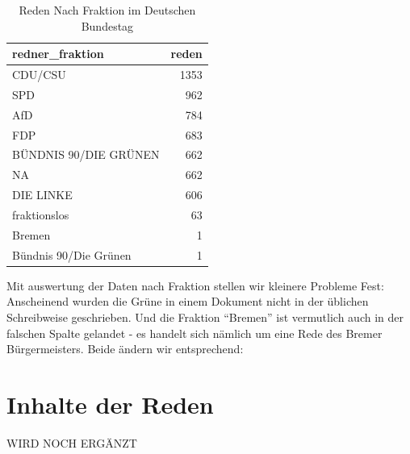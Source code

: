\documentclass[oneside, 12pt, numbers=endperiod]{scrbook}
\newenvironment{Shaded}{\begin{snugshade}}{\end{snugshade}}
\newcommand{\DataTypeTok}[1]{\textcolor[rgb]{0.13,0.29,0.53}{#1}}
\newcommand{\DecValTok}[1]{\textcolor[rgb]{0.00,0.00,0.81}{#1}}
\newcommand{\KeywordTok}[1]{\textcolor[rgb]{0.13,0.29,0.53}{\textbf{#1}}}
\newcommand{\NormalTok}[1]{#1}
\newcommand{\OperatorTok}[1]{\textcolor[rgb]{0.81,0.36,0.00}{\textbf{#1}}}
\newcommand{\StringTok}[1]{\textcolor[rgb]{0.31,0.60,0.02}{#1}}
\theoremstyle{definition}
\theoremstyle{definition}
\theoremstyle{definition}
\theoremstyle{remark}
\begin{document}
\begin{table}

\caption{\label{tab:unnamed-chunk-17}Reden Nach Fraktion im Deutschen Bundestag}
\centering
\begin{tabular}[t]{lr}
\toprule
redner\_fraktion & reden\\
\midrule
CDU/CSU & 1353\\
SPD & 962\\
AfD & 784\\
FDP & 683\\
BÜNDNIS 90/DIE GRÜNEN & 662\\
\addlinespace
NA & 662\\
DIE LINKE & 606\\
fraktionslos & 63\\
Bremen & 1\\
Bündnis 90/Die Grünen & 1\\
\bottomrule
\end{tabular}
\end{table}

Mit auswertung der Daten nach Fraktion stellen wir kleinere Probleme
Fest: Anscheinend wurden die Grüne in einem Dokument nicht in der
üblichen Schreibweise geschrieben. Und die Fraktion ``Bremen'' ist
vermutlich auch in der falschen Spalte gelandet - es handelt sich
nämlich um eine Rede des Bremer Bürgermeisters. Beide ändern wir
entsprechend:

\begin{Shaded}
\end{Shaded}

\hypertarget{inhalte-der-reden}{%
\section{Inhalte der Reden}\label{inhalte-der-reden}}

WIRD NOCH ERGÄNZT
\end{document}
